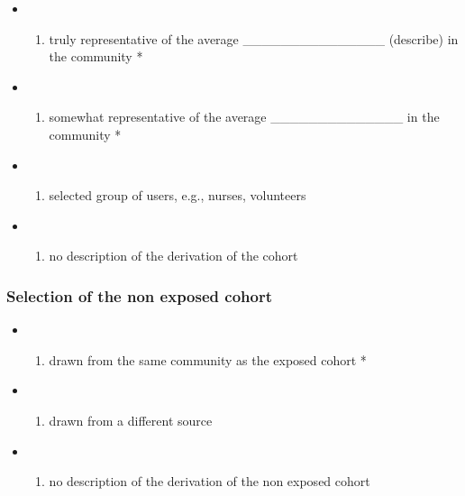 \documentclass[
  doc, a4paper]{apa7}
\providecommand{\tightlist}{%
  \setlength{\itemsep}{0pt}\setlength{\parskip}{0pt}}
\begin{document}
\begin{itemize}
\tightlist
\item
  \begin{enumerate}
  \def\labelenumi{\alph{enumi})}
  \tightlist
  \item
    truly representative of the average \_\_\_\_\_\_\_\_\_\_\_\_\_\_\_ (describe) in the community *
  \end{enumerate}
\item
  \begin{enumerate}
  \def\labelenumi{\alph{enumi})}
  \setcounter{enumi}{1}
  \tightlist
  \item
    somewhat representative of the average \_\_\_\_\_\_\_\_\_\_\_\_\_\_ in the community *
  \end{enumerate}
\item
  \begin{enumerate}
  \def\labelenumi{\alph{enumi})}
  \setcounter{enumi}{2}
  \tightlist
  \item
    selected group of users, e.g., nurses, volunteers
  \end{enumerate}
\item
  \begin{enumerate}
  \def\labelenumi{\alph{enumi})}
  \setcounter{enumi}{3}
  \tightlist
  \item
    no description of the derivation of the cohort
  \end{enumerate}
\end{itemize}

\subsubsection{Selection of the non exposed cohort}\label{selection-of-the-non-exposed-cohort}

\begin{itemize}
\tightlist
\item
  \begin{enumerate}
  \def\labelenumi{\alph{enumi})}
  \tightlist
  \item
    drawn from the same community as the exposed cohort *
  \end{enumerate}
\item
  \begin{enumerate}
  \def\labelenumi{\alph{enumi})}
  \setcounter{enumi}{1}
  \tightlist
  \item
    drawn from a different source
  \end{enumerate}
\item
  \begin{enumerate}
  \def\labelenumi{\alph{enumi})}
  \setcounter{enumi}{2}
  \tightlist
  \item
    no description of the derivation of the non exposed cohort
  \end{enumerate}
\end{itemize}
\end{document}
